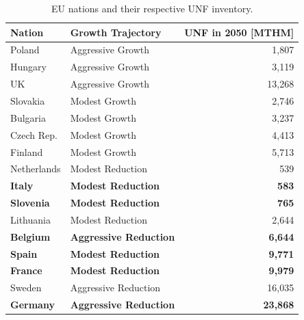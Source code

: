 \begin{table}[h]
    \centering
    \caption {\gls{EU} nations and their respective \gls{UNF} inventory.} 
                \begin{tabular}{llr}
                    \hline 
                    \textbf{Nation} & \textbf{Growth Trajectory} & \small{\textbf{UNF in 2050 [MTHM] }}\\
                    \hline
                    Poland & Aggressive Growth & 1,807\\
                    Hungary & Aggressive Growth & 3,119 \\ 
                    UK & Aggressive Growth & 13,268\\
                    Slovakia & Modest Growth & 2,746\\
                    Bulgaria & Modest Growth & 3,237 \\
                    Czech Rep. & Modest Growth & 4,413\\
                    Finland & Modest Growth &  5,713\\
                    Netherlands & Modest Reduction & 539\\
                    \textbf{Italy} & \textbf{Modest Reduction} & \textbf{583}\\
                    \textbf{Slovenia} & \textbf{Modest Reduction} & \textbf{765}\\
                    Lithuania & Modest Reduction & 2,644 \\
                    \textbf{Belgium} & \textbf{Aggressive Reduction} & \textbf{6,644}\\
                    \textbf{Spain} & \textbf{Modest Reduction} &  \textbf{9,771} \\
                    \textbf{France} & \textbf{Modest Reduction} & \textbf{9,979} \\
                    Sweden & Aggressive Reduction & 16,035\\
                    \textbf{Germany} & \textbf{Aggressive Reduction} & \textbf{23,868}\\
                    \hline
                \end{tabular}
   
    \label{tab:which_send}

\end{table}

